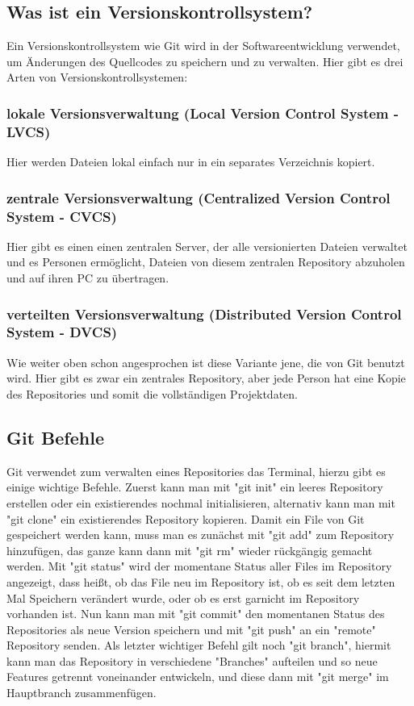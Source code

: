 \subsection{Was ist ein Versionskontrollsystem?}

Ein Versionskontrollsystem wie Git wird in der Softwareentwicklung verwendet, 
um Änderungen des Quellcodes zu speichern und zu verwalten. 
Hier gibt es drei Arten von Versionskontrollsystemen:
\cite{sysarch-git-2}

\subsubsection{lokale Versionsverwaltung (Local Version Control System - LVCS)}
Hier werden Dateien lokal einfach nur in ein separates Verzeichnis kopiert.
\cite{sysarch-git-2}

\subsubsection{zentrale Versionsverwaltung (Centralized Version Control System - CVCS)}
Hier gibt es einen einen zentralen Server, der alle versionierten Dateien verwaltet und es Personen ermöglicht, 
Dateien von diesem zentralen Repository abzuholen und auf ihren PC zu übertragen.
\cite{sysarch-git-2}

\subsubsection{verteilten Versionsverwaltung (Distributed Version Control System - DVCS)}
Wie weiter oben schon angesprochen ist diese Variante jene, die von Git benutzt wird. Hier gibt es zwar ein zentrales Repository, 
aber jede Person  hat eine Kopie des Repositories und somit die vollständigen Projektdaten.
\cite{sysarch-git-2}

\subsection{Git Befehle}

Git verwendet zum verwalten eines Repositories das Terminal, hierzu gibt es einige wichtige Befehle. Zuerst kann man mit "git init" ein leeres Repository erstellen 
oder ein existierendes nochmal initialisieren, alternativ kann man mit "git clone" ein existierendes Repository kopieren. Damit ein File von Git gespeichert werden
kann, muss man es zunächst mit "git add" zum Repository hinzufügen, das ganze kann dann mit "git rm" wieder rückgängig gemacht werden. Mit "git status" wird der 
momentane Status aller Files im Repository angezeigt, dass heißt, ob das File neu im Repository ist, ob es seit dem letzten Mal Speichern verändert wurde, oder ob es 
erst garnicht im Repository vorhanden ist. Nun kann man mit "git commit" den momentanen Status des Repositories als neue Version speichern und mit "git push" an ein "remote" 
Repository senden. Als letzter wichtiger Befehl gilt noch "git branch", hiermit kann man das Repository in verschiedene "Branches" aufteilen und so 
neue Features getrennt voneinander entwickeln, und diese dann mit "git merge" im Hauptbranch zusammenfügen.
\cite{sysarch-git-2}

